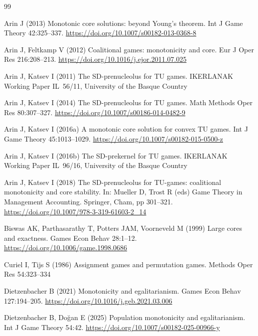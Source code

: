 \documentclass[11pt]{article}
\begin{document}
\begin{thebibliography}{99}

Arin J (2013) Monotonic core solutions: beyond Young's theorem.
Int J Game Theory 42:325--337.
\url{https://doi.org/10.1007/s00182-013-0368-8}

Arin J, Feltkamp V (2012) Coalitional games: monotonicity and core.
Eur J Oper Res 216:208--213.
\url{https://doi.org/10.1016/j.ejor.2011.07.025}

Arin J, Katsev I (2011) The SD-prenucleolus for TU games.
IKERLANAK Working Paper IL~56/11, University of the Basque Country

Arin J, Katsev I (2014) The SD-prenucleolus for TU games.
Math Methods Oper Res 80:307--327.
\url{https://doi.org/10.1007/s00186-014-0482-9}

Arin J, Katsev I (2016a) A monotonic core solution for convex TU games.
Int J Game Theory 45:1013--1029.
\url{https://doi.org/10.1007/s00182-015-0500-z}

Arin J, Katsev I (2016b) The SD-prekernel for TU games.
IKERLANAK Working Paper IL~96/16, University of the Basque Country

Arin J, Katsev I (2018) The SD-prenucleolus for TU-games: coalitional
monotonicity and core stability. In: Mueller D, Trost R (eds) Game Theory
in Management Accounting. Springer, Cham, pp 301--321.
\url{https://doi.org/10.1007/978-3-319-61603-2_14}

Biswas AK, Parthasarathy T, Potters JAM, Voorneveld M (1999) Large cores
and exactness. Games Econ Behav 28:1--12.
\url{https://doi.org/10.1006/game.1998.0686}

Curiel I, Tijs S (1986) Assignment games and permutation games.
Methods Oper Res 54:323--334

Dietzenbacher B (2021) Monotonicity and egalitarianism.
Games Econ Behav 127:194--205.
\url{https://doi.org/10.1016/j.geb.2021.03.006}

Dietzenbacher B, Do\u{g}an E (2025) Population monotonicity and
egalitarianism. Int J Game Theory 54:42.
\url{https://doi.org/10.1007/s00182-025-00966-y}


\end{thebibliography}
\end{document}
